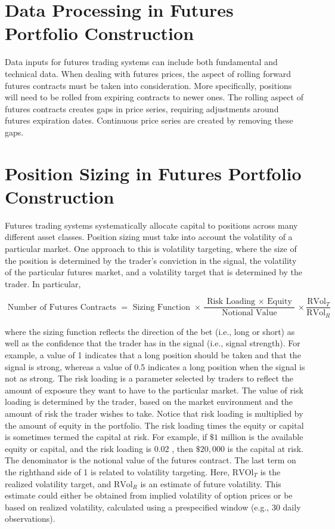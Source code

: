 \documentclass[11pt]{article}
\begin{document}
\section*{Data Processing in Futures Portfolio Construction}
Data inputs for futures trading systems can include both fundamental and technical data. When dealing with futures prices, the aspect of rolling forward futures contracts must be taken into consideration. More specifically, positions will need to be rolled from expiring contracts to newer ones. The rolling aspect of futures contracts creates gaps in price series, requiring adjustments around futures expiration dates. Continuous price series are created by removing these gaps.

\section*{Position Sizing in Futures Portfolio Construction}
Futures trading systems systematically allocate capital to positions across many different asset classes. Position sizing must take into account the volatility of a particular market. One approach to this is volatility targeting, where the size of the position is determined by the trader's conviction in the signal, the volatility of the particular futures market, and a volatility target that is determined by the trader. In particular,


\begin{equation*}
\text { Number of Futures Contracts }=\text { Sizing Function } \times \frac{\text { Risk Loading } \times \text { Equity }}{\text { Notional Value }} \times \frac{\mathrm{RVol}_{T}}{\mathrm{RVol}_{R}} \tag{1}
\end{equation*}


where the sizing function reflects the direction of the bet (i.e., long or short) as well as the confidence that the trader has in the signal (i.e., signal strength). For example, a value of 1 indicates that a long position should be taken and that the signal is strong, whereas a value of 0.5 indicates a long position when the signal is not as strong. The risk loading is a parameter selected by traders to reflect the amount of exposure they want to have to the particular market. The value of risk loading is determined by the trader, based on the market environment and the amount of risk the trader wishes to take. Notice that risk loading is multiplied by the amount of equity in the portfolio. The risk loading times the equity or capital is sometimes termed the capital at risk. For example, if $\$ 1$ million is the available equity or capital, and the risk loading is 0.02 , then $\$ 20,000$ is the capital at risk. The denominator is the notional value of the futures contract. The last term on the righthand side of 1 is related to volatility targeting. Here, $\mathrm{RVOl}_{T}$ is the realized volatility target, and $\mathrm{RVol}_{R}$ is an estimate of future volatility. This estimate could either be obtained from implied volatility of option prices or be based on realized volatility, calculated using a prespecified window (e.g., 30 daily observations).
\end{document}
